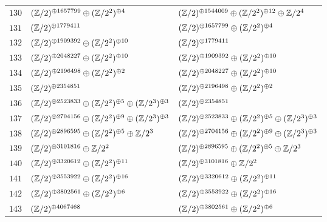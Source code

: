 \begin{supertabular}{|c|p{5.5cm}|p{5.5cm}|}
$130$%
&$(\mathbb{Z}/2)^{\oplus1657799}\oplus(\mathbb{Z}/2^{2})^{\oplus4}$%
&$(\mathbb{Z}/2)^{\oplus1544009}\oplus(\mathbb{Z}/2^{2})^{\oplus12}\oplus\mathbb{Z}/2^{4}$\\

$131$%
&$(\mathbb{Z}/2)^{\oplus1779411}$%
&$(\mathbb{Z}/2)^{\oplus1657799}\oplus(\mathbb{Z}/2^{2})^{\oplus4}$\\

$132$%
&$(\mathbb{Z}/2)^{\oplus1909392}\oplus(\mathbb{Z}/2^{2})^{\oplus10}$%
&$(\mathbb{Z}/2)^{\oplus1779411}$\\

$133$%
&$(\mathbb{Z}/2)^{\oplus2048227}\oplus(\mathbb{Z}/2^{2})^{\oplus10}$%
&$(\mathbb{Z}/2)^{\oplus1909392}\oplus(\mathbb{Z}/2^{2})^{\oplus10}$\\

$134$%
&$(\mathbb{Z}/2)^{\oplus2196498}\oplus(\mathbb{Z}/2^{2})^{\oplus2}$%
&$(\mathbb{Z}/2)^{\oplus2048227}\oplus(\mathbb{Z}/2^{2})^{\oplus10}$\\

$135$%
&$(\mathbb{Z}/2)^{\oplus2354851}$%
&$(\mathbb{Z}/2)^{\oplus2196498}\oplus(\mathbb{Z}/2^{2})^{\oplus2}$\\

$136$%
&$(\mathbb{Z}/2)^{\oplus2523833}\oplus(\mathbb{Z}/2^{2})^{\oplus5}\oplus(\mathbb{Z}/2^{3})^{\oplus3}$%
&$(\mathbb{Z}/2)^{\oplus2354851}$\\

$137$%
&$(\mathbb{Z}/2)^{\oplus2704156}\oplus(\mathbb{Z}/2^{2})^{\oplus9}\oplus(\mathbb{Z}/2^{3})^{\oplus3}$%
&$(\mathbb{Z}/2)^{\oplus2523833}\oplus(\mathbb{Z}/2^{2})^{\oplus5}\oplus(\mathbb{Z}/2^{3})^{\oplus3}$\\

$138$%
&$(\mathbb{Z}/2)^{\oplus2896595}\oplus(\mathbb{Z}/2^{2})^{\oplus5}\oplus\mathbb{Z}/2^{3}$%
&$(\mathbb{Z}/2)^{\oplus2704156}\oplus(\mathbb{Z}/2^{2})^{\oplus9}\oplus(\mathbb{Z}/2^{3})^{\oplus3}$\\

$139$%
&$(\mathbb{Z}/2)^{\oplus3101816}\oplus\mathbb{Z}/2^{2}$%
&$(\mathbb{Z}/2)^{\oplus2896595}\oplus(\mathbb{Z}/2^{2})^{\oplus5}\oplus\mathbb{Z}/2^{3}$\\

$140$%
&$(\mathbb{Z}/2)^{\oplus3320612}\oplus(\mathbb{Z}/2^{2})^{\oplus11}$%
&$(\mathbb{Z}/2)^{\oplus3101816}\oplus\mathbb{Z}/2^{2}$\\

$141$%
&$(\mathbb{Z}/2)^{\oplus3553922}\oplus(\mathbb{Z}/2^{2})^{\oplus16}$%
&$(\mathbb{Z}/2)^{\oplus3320612}\oplus(\mathbb{Z}/2^{2})^{\oplus11}$\\

$142$%
&$(\mathbb{Z}/2)^{\oplus3802561}\oplus(\mathbb{Z}/2^{2})^{\oplus6}$%
&$(\mathbb{Z}/2)^{\oplus3553922}\oplus(\mathbb{Z}/2^{2})^{\oplus16}$\\

$143$%
&$(\mathbb{Z}/2)^{\oplus4067468}$%
&$(\mathbb{Z}/2)^{\oplus3802561}\oplus(\mathbb{Z}/2^{2})^{\oplus6}$\\


\end{supertabular}

